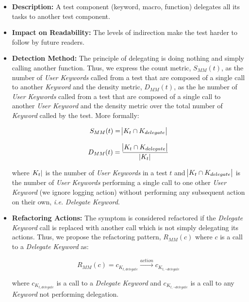 \begin{itemize}
    \item \textbf{Description:} A test component (keyword, macro, function) delegates all its tasks to another test component.

    \item \textbf{Impact on Readability:} The levels of indirection make the test harder to follow by future readers.
    
    \item \textbf{Detection Method:} The principle of delegating is doing nothing and simply calling another function. Thus, we express the count metric, $S_{MM}(t)$, as the number of \emph{User Keywords} called from a test that are composed of a single call to another \emph{Keyword} and the density metric, $D_{MM}(t)$, as the he number of \emph{User Keywords} called from a test that are composed of a single call to another \emph{User Keyword} and the density metric over the total number of \emph{Keyword} called by the test. More formally:
    
    \begin{equation*}
        S_{MM}(t) = \abs{K_{t} \cap K_{delegate}}
    \end{equation*}
    
    \begin{equation*}
        D_{MM}(t) = \frac{\abs{K_{t} \cap K_{delegate}}}{\abs{K_{t}}}
    \end{equation*}
    
    where $\abs{K_{t}}$ is the number of \emph{User Keywords} in a test $t$ and $\abs{K_{t} \cap K_{delegate}}$ is the number of \emph{User Keywords} performing a single call to one other \emph{User Keyword} (we ignore logging action) without performing any subsequent action on their own, \emph{i.e.} \emph{Delegate Keyword}.
    
    \item \textbf{Refactoring Actions:} The symptom is considered refactored if the \emph{Delegate Keyword} call is replaced with another call which is not simply delegating its actions. Thus, we propose the refactoring pattern, $R_{MM}(c)$ where $c$ is a call to a \emph{Delegate Keyword} as:

    \begin{equation*}
        R_{MM}(c) = c_{K_{t, delegate}} \xrightarrow{action} c_{K_{t, \neg delegate}}
    \end{equation*}
    
    where $c_{K_{t, delegate}}$ is a call to a \emph{Delegate Keyword} and $c_{K_{t, \neg delegate}}$ is a call to any \emph{Keyword} not performing delegation.
\end{itemize}

